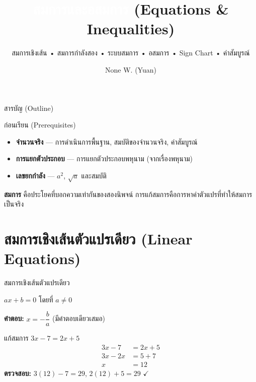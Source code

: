 \documentclass[11pt, aspectratio=169]{beamer}
\title[สมการ]{\textcolor{white}{สมการและอสมการ} \textcolor{boxBlue!60}{(Equations \& Inequalities)}}
\subtitle{สมการเชิงเส้น • สมการกำลังสอง • ระบบสมการ • อสมการ • Sign Chart • ค่าสัมบูรณ์ }
\author[None W. (Yuan)]{None W. (Yuan)}
\date{}
\begin{document}
\begin{frame}[plain]
  \titlepage
\end{frame}

\begin{frame}{สารบัญ (Outline)}
  \tableofcontents
\end{frame}

\begin{frame}{ก่อนเรียน (Prerequisites)}
  \begin{explanation}
    \begin{itemize}
      \item \textbf{จำนวนจริง} — การดำเนินการพื้นฐาน, สมบัติของจำนวนจริง, ค่าสัมบูรณ์
      \item \textbf{การแยกตัวประกอบ} — การแยกตัวประกอบพหุนาม (จากเรื่องพหุนาม)
      \item \textbf{เลขยกกำลัง} — $a^2$, $\sqrt{a}$ และสมบัติ
    \end{itemize}
  \end{explanation}

  \begin{intuition}
    \textbf{สมการ} คือประโยคที่บอกความเท่ากันของสองนิพจน์
    การแก้สมการคือการหาค่าตัวแปรที่ทำให้สมการเป็นจริง
  \end{intuition}
\end{frame}

\section{สมการเชิงเส้นตัวแปรเดียว (Linear Equations)}

\begin{frame}{สมการเชิงเส้นตัวแปรเดียว}
  \begin{explanation}
    $ax + b = 0$ \quad โดยที่ $a \neq 0$

    \textbf{คำตอบ:} $x = -\dfrac{b}{a}$ \quad (มีคำตอบเดียวเสมอ)
  \end{explanation}

  \begin{exambox}
    แก้สมการ $3x - 7 = 2x + 5$
    \begin{align*}
      3x - 7 &= 2x + 5 \\
      3x - 2x &= 5 + 7 \\
      x &= 12
    \end{align*}
    \textbf{ตรวจสอบ:} $3(12) - 7 = 29$, \; $2(12) + 5 = 29$ \quad $\checkmark$
  \end{exambox}
\end{frame}
\end{document}
